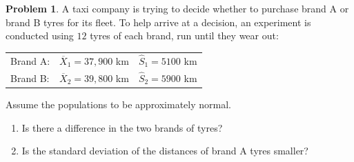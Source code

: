 \documentclass[11pt,a4paper]{article}
\theoremstyle{definition}
\newtheorem{problemx}{Problem}[section]
\newenvironment{problem}{\begin{problemx}}{\end{problemx}}
\begin{document}
\begin{problem}
A taxi company is trying to decide whether to purchase brand A or brand B tyres for its
fleet. To help arrive at a decision, an experiment is conducted using $12$ tyres of each
brand, run until they wear out:
\begin{table}[H]
\centering
\begin{tabular}{lll}
Brand A: & $\overline{X}_1=37{,}900$ km & $\hat{S}_1=5100$ km\\
Brand B: & $\overline{X}_2=39{,}800$ km & $\hat{S}_2=5900$ km\\
\end{tabular}
\end{table}
Assume the populations to be approximately normal.
\begin{enumerate}
\item[(a).] Is there a difference in the two brands of tyres?
\item[(b).] Is the standard deviation of the distances of brand A tyres smaller?
\end{enumerate}
\end{problem}
\end{document}
